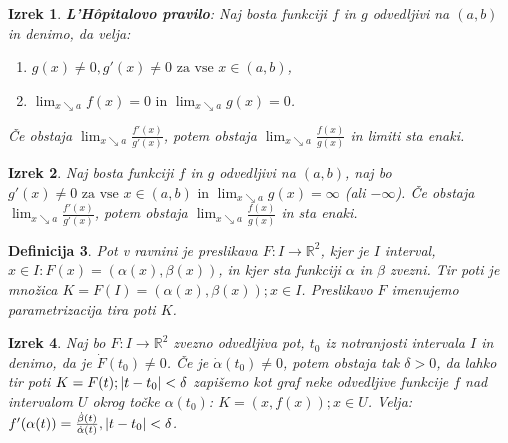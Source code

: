 \documentclass[a4paper,12pt]{report}
\newtheorem{izrek}{Izrek}[section]
\newtheorem{definicija}[izrek]{Definicija}
\begin{document}
\begin{izrek}
    \textbf{L'Hôpitalovo pravilo}: Naj bosta funkciji $f$ in $g$ odvedljivi na $(a,b)$ in denimo, da velja:
    \begin{enumerate}
        \item $g(x) \neq 0, g'(x) \neq 0 \text{ za vse } x \in (a,b)$,
        \item $\lim_{x \searrow a} f(x) = 0 \text{ in } \lim_{x \searrow a} g(x) = 0$.
    \end{enumerate} 
    Če obstaja $\lim_{x \searrow a} \frac{f'(x)}{g'(x)}$, potem obstaja $\lim_{x \searrow a} \frac{f(x)}{g(x)}$ in limiti sta enaki.
\end{izrek}

\begin{izrek}
    Naj bosta funkciji $f$ in $g$ odvedljivi na $(a,b)$, naj bo $g'(x) \neq 0 \text{ za vse } x \in (a,b) \text{ in } \lim_{x \searrow a} g(x) = \infty$ (ali $- \infty$). 
    Če obstaja $\lim_{x \searrow a} \frac{f'(x)}{g'(x)}$, potem obstaja $\lim_{x \searrow a} \frac{f(x)}{g(x)}$ in sta enaki.
\end{izrek}

\begin{definicija}
    Pot v ravnini je preslikava $F: I \to \mathbb{R}^2$, kjer je $I$ interval, $x \in I: F(x) = (\alpha(x), \beta(x))$, in kjer sta funkciji $\alpha$ in $\beta$ 
    zvezni. Tir poti je množica $K = F(I) = {(\alpha(x), \beta(x)); x \in I}$. Preslikavo $F$ imenujemo parametrizacija tira poti $K$.
\end{definicija}

\begin{izrek}
    Naj bo $F: I \to \mathbb{R}^2$ zvezno odvedljiva pot, $t_0$ iz notranjosti intervala $I$ in denimo, da je $\dot{F}(t_0) \neq 0$. Če je $\dot{\alpha}(t_0) \neq 0$, 
    potem obstaja tak $\delta > 0$, da lahko tir poti $K = {F(t); \abs{t - t_0} < \delta}$ zapišemo kot graf neke odvedljive funkcije $f$ nad intervalom $U$ 
    okrog točke $\alpha(t_0)$: $K = {(x, f(x)); x \in U}$. Velja: $f'(\alpha(t)) = \frac{\dot{\beta}(t)}{\dot{\alpha}(t)}, \abs{t - t_0} < \delta$.
\end{izrek}


\pagebreak
\end{document}
